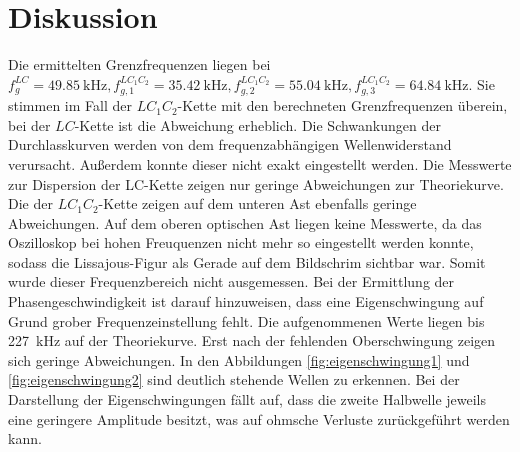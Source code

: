 \section{Diskussion}
\label{sec:Diskussion}

Die ermittelten Grenzfrequenzen liegen bei   $f_g^{LC} = \SI{49,85}{\kilo\hertz},
f_{g,1}^{LC_1C_2} = \SI{35,42}{\kilo\hertz},
f_{g,2}^{LC_1C_2} = \SI{55,04}{\kilo\hertz},
f_{g,3}^{LC_1C_2} = \SI{64,84}{\kilo\hertz}$. Sie stimmen im Fall der $LC_1C_2$-Kette mit den berechneten Grenzfrequenzen überein, bei der $LC$-Kette ist die Abweichung erheblich.
Die Schwankungen der Durchlasskurven werden von dem frequenzabhängigen Wellenwiderstand verursacht. Außerdem konnte dieser nicht exakt eingestellt werden. Die Messwerte zur Dispersion der LC-Kette zeigen nur geringe Abweichungen zur Theoriekurve. Die der $LC_{1}C_{2}$-Kette zeigen auf dem unteren Ast ebenfalls geringe Abweichungen. Auf dem oberen optischen Ast liegen keine Messwerte, da das Oszilloskop bei hohen Freuquenzen nicht mehr so eingestellt werden konnte, sodass die Lissajous-Figur als Gerade auf dem Bildschrim sichtbar war. Somit wurde dieser Frequenzbereich nicht ausgemessen. Bei der Ermittlung der Phasengeschwindigkeit ist darauf hinzuweisen, dass eine Eigenschwingung auf Grund grober Frequenzeinstellung fehlt. Die aufgenommenen Werte liegen bis \SI{227}{\kilo\Hz} auf der Theoriekurve. Erst nach der fehlenden Oberschwingung zeigen sich geringe Abweichungen.
 In  den Abbildungen \ref{fig:eigenschwingung1} und \ref{fig:eigenschwingung2} sind deutlich stehende Wellen zu erkennen. Bei der Darstellung der Eigenschwingungen fällt auf, dass die zweite Halbwelle jeweils eine geringere Amplitude besitzt, was auf ohmsche Verluste zurückgeführt werden kann.
